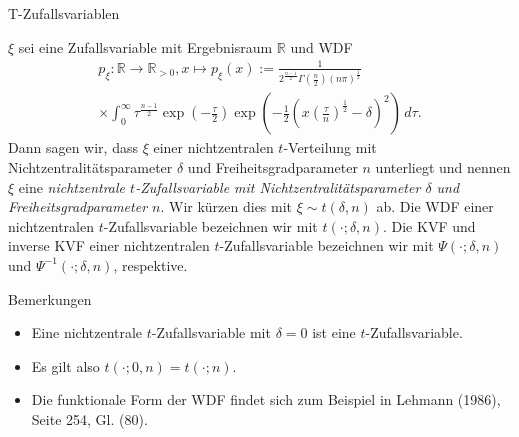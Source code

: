 \documentclass[
  8pt,
  ignorenonframetext,
]{beamer}
\providecommand{\tightlist}{%
  \setlength{\itemsep}{0pt}\setlength{\parskip}{0pt}}
\begin{document}
\begin{frame}{T-Zufallsvariablen}
\protect\hypertarget{t-zufallsvariablen-3}{}
\footnotesize
\begin{definition}
\justifying
$\xi$ sei eine Zufallsvariable mit Ergebnisraum $\mathbb{R}$ und WDF
\begin{multline}
p_\xi : \mathbb{R} \to \mathbb{R}_{>0}, x \mapsto p_\xi(x) :=
\frac{1}{2^{\frac{n-1}{2}}\Gamma\left(\frac{n}{2} \right)(n \pi)^{\frac{1}{2}}} \\
\times \int_{0}^\infty \tau^{\frac{n-1}{2}} \exp\left(-\frac{\tau}{2}\right)
\exp\left(-\frac{1}{2}\left(x \left(\frac{\tau}{n}\right)^{\frac{1}{2}} - \delta \right)^2 \right)\,d\tau.
\end{multline}
Dann sagen wir, dass $\xi$ einer nichtzentralen $t$-Verteilung mit
Nichtzentralitätsparameter $\delta$ und Freiheitsgradparameter $n$ unterliegt
und nennen $\xi$ eine \textit{nichtzentrale $t$-Zufallsvariable mit Nichtzentralitätsparameter $\delta$ und
Freiheitsgradparameter $n$}. Wir kürzen dies mit $\xi \sim t(\delta, n)$ ab. Die WDF einer
nichtzentralen $t$-Zufallsvariable  bezeichnen wir mit
$t(\cdot;\delta,n)$. Die KVF und inverse KVF einer nichtzentralen $t$-Zufallsvariable
bezeichnen wir mit $\Psi(\cdot; \delta, n)$ und $\Psi^{-1}(\cdot; \delta, n)$, respektive.
\end{definition}

Bemerkungen

\begin{itemize}
\tightlist
\item
  Eine nichtzentrale \(t\)-Zufallsvariable mit \(\delta = 0\) ist eine
  \(t\)-Zufallsvariable.
\item
  Es gilt also \(t(\cdot;0,n) = t(\cdot;n)\).
\item
  Die funktionale Form der WDF findet sich zum Beispiel in Lehmann
  (1986), Seite 254, Gl. (80).
\end{itemize}
\end{frame}
\end{document}
